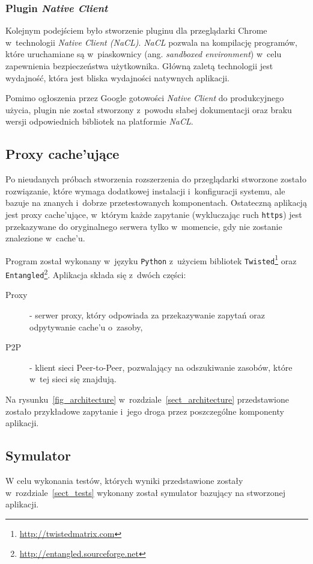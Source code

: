\documentclass[a4paper,11pt]{scrartcl}
\newcommand{\f}{\texttt}
\newcommand{\s}{ }
\newcommand{\keszu}{cache'u}
\newcommand{\keszujace}{cache'ujące}
\begin{document}
\subsubsection{Plugin \textit{Native Client}}
\label{sect_plugin_2}
Kolejnym podejściem było stworzenie pluginu dla przeglądarki Chrome w~technologii \textit{Native Client (NaCL)}. \textit{NaCL} pozwala na kompilację programów, które uruchamiane są w~piaskownicy (ang. \textit{sandboxed environment}) w~celu zapewnienia bezpieczeństwa użytkownika. Główną zaletą technologii jest wydajność, która jest bliska wydajności natywnych aplikacji.

Pomimo ogłoszenia przez Google gotowości \textit{Native Client} do produkcyjnego użycia, plugin nie został stworzony z~powodu słabej dokumentacji oraz braku wersji odpowiednich bibliotek na platformie \textit{NaCL}.

\subsection{Proxy \keszujace}
\label{sect_impl_proxy}
Po nieudanych próbach stworzenia rozszerzenia do przeglądarki stworzone zostało rozwiązanie, które wymaga dodatkowej instalacji i~konfiguracji systemu, ale bazuje na znanych i~dobrze przetestowanych komponentach. Ostateczną aplikacją jest proxy \keszujace, w~którym każde zapytanie (wykluczając ruch \f{https}) jest przekazywane do oryginalnego serwera tylko w~momencie, gdy nie zostanie znalezione w~\keszu.

Program został wykonany w~języku \f{Python} z~użyciem bibliotek \f{Twisted}\footnote{\url{http://twistedmatrix.com}} oraz \f{Entangled}\footnote{\url{http://entangled.sourceforge.net}}. Aplikacja składa się z~dwóch części:
\begin{description}
  \item[Proxy]{ - serwer proxy, który odpowiada za przekazywanie zapytań oraz odpytywanie \keszu\s o~zasoby,}
  \item[P2P]{ - klient sieci Peer-to-Peer, pozwalający na odszukiwanie zasobów, które w~tej sieci się znajdują.}
\end{description}
Na rysunku~\ref{fig_architecture} w~rozdziale~\ref{sect_architecture} przedstawione zostało przykładowe zapytanie i~jego droga przez poszczególne komponenty aplikacji. 

\subsection{Symulator}
\label{sect_impl_simulator}
W celu wykonania testów, których wyniki przedstawione zostały w~rozdziale~\ref{sect_tests} wykonany został symulator bazujący na stworzonej aplikacji. 
\end{document}
